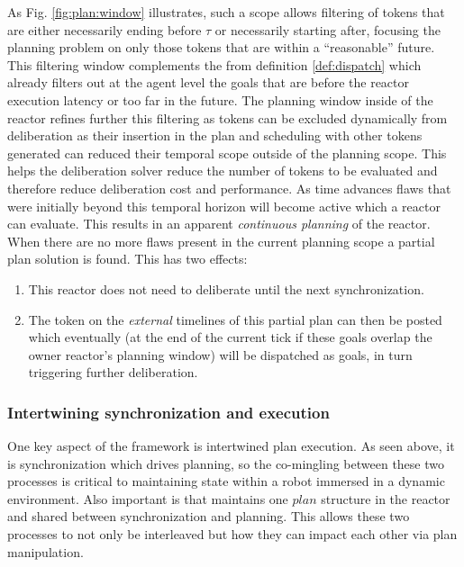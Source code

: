 As Fig. \ref{fig:plan:window} illustrates,  such a
scope allows filtering of tokens that are either necessarily ending
before $\tau$ or necessarily starting after, focusing the planning
problem on only those tokens that are within a ``reasonable''
future. This filtering window complements the  from definition \ref{def:dispatch} which already filters
out at the agent level the goals that are before the reactor execution
latency or too far in the future. The planning window inside of the
reactor refines further this filtering as tokens can be excluded
dynamically from deliberation as their insertion in the plan and
scheduling with other tokens generated can reduced their temporal
scope outside of the planning scope. This helps the deliberation 
solver reduce the number of tokens to be evaluated and therefore
reduce deliberation cost and performance. As time advances flaws that
were initially beyond this temporal horizon will become active which a
reactor can evaluate. This results in an apparent \emph{continuous
  planning} of the reactor. When there are no more flaws present in
the current planning scope a partial plan solution is found. This has
two effects:

\begin{enumerate}

\item This reactor does not need to deliberate until the next
  synchronization. 

\item The token on the {\em external} timelines of this partial plan
  can then be posted which eventually (at the end of the current tick
  if these goals overlap the owner reactor's planning window) will be
  dispatched as goals, in turn triggering further deliberation.

\end{enumerate}


\subsubsection{Intertwining synchronization and execution}
\label{sec:arch:intertwine}

One key aspect of the \rx framework is intertwined plan execution. As
seen above, it is synchronization which drives planning, so the
co-mingling between these two processes is critical to maintaining
state within a robot immersed in a dynamic environment. Also important
is that \rx maintains 
one $plan$ structure in the reactor and shared between synchronization
and planning. This allows these two processes to not only be
interleaved but how they can impact each other via plan manipulation.

